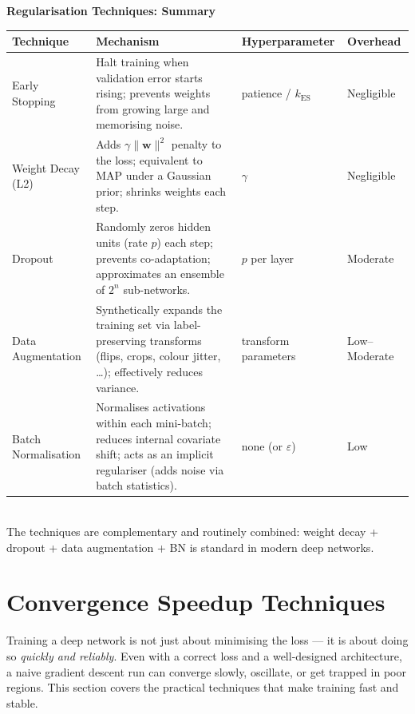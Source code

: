 \documentclass[11pt,a4paper]{article}
\begin{document}
\begin{tcolorbox}[colback=LightBlue,colframe=AccentBlue,boxrule=0.8pt,arc=3pt]
\textbf{Regularisation Techniques: Summary}\\[6pt]
\begin{tabularx}{\linewidth}{@{}l X l l@{}}
\toprule
\textbf{Technique} & \textbf{Mechanism} & \textbf{Hyperparameter} & \textbf{Overhead} \\
\midrule
Early Stopping
  & Halt training when validation error starts rising; prevents weights from growing large and memorising noise.
  & patience / $k_{\mathrm{ES}}$
  & Negligible \\[4pt]
Weight Decay (L2)
  & Adds $\gamma\|\mathbf{w}\|^2$ penalty to the loss; equivalent to MAP under a Gaussian prior; shrinks weights each step.
  & $\gamma$
  & Negligible \\[4pt]
Dropout
  & Randomly zeros hidden units (rate $p$) each step; prevents co-adaptation; approximates an ensemble of $2^n$ sub-networks.
  & $p$ per layer
  & Moderate \\[4pt]
Data Augmentation
  & Synthetically expands the training set via label-preserving transforms (flips, crops, colour jitter, \ldots); effectively reduces variance.
  & transform parameters
  & Low–Moderate \\[4pt]
Batch Normalisation
  & Normalises activations within each mini-batch; reduces internal covariate shift; acts as an implicit regulariser (adds noise via batch statistics).
  & none (or $\varepsilon$)
  & Low \\
\bottomrule
\end{tabularx}\\[6pt]
The techniques are complementary and routinely combined: weight decay + dropout + data augmentation + BN is standard in modern deep networks.
\end{tcolorbox}

\section{Convergence Speedup Techniques}
\label{sec:convergence}

Training a deep network is not just about minimising the loss — it is about doing so \emph{quickly and reliably}. Even with a correct loss and a well-designed architecture, a naive gradient descent run can converge slowly, oscillate, or get trapped in poor regions. This section covers the practical techniques that make training fast and stable.
\end{document}
